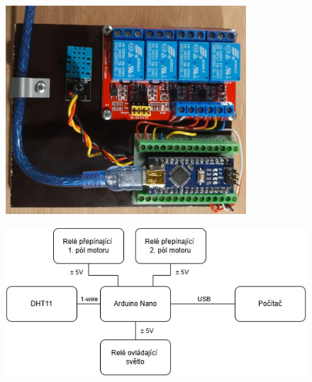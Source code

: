\begin{figure}[htbp]
    \centering
    \begin{minipage}[b]{0.8\textwidth}
        \centering
        \includegraphics[width=0.8\textwidth]{img/ridici_jednotka}
        \label{fig:ridici_jednotka}
    \end{minipage}
    \begin{minipage}[b]{0.8\textwidth}
        \centering
        \includegraphics[width=1.0\textwidth]{img/schema_ridici_jednotky}
        \label{fig:schema_ridici_jednotky}
    \end{minipage}
\end{figure}

